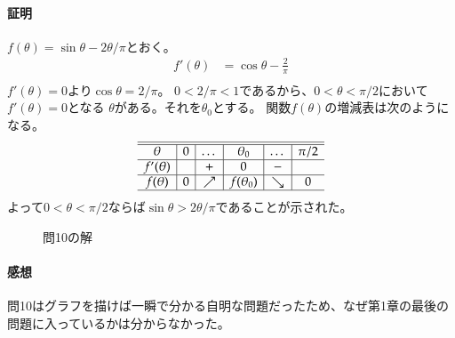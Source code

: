 \paragraph{証明}
$f(\theta)=\sin\theta-2\theta/\pi$とおく。
\begin{align*}
    f'(\theta)&=\cos\theta-\frac{2}{\pi}\\
\end{align*}
$f'(\theta)=0$より$\cos\theta=2/\pi$。
$0<2/\pi<1$であるから、$0<\theta<\pi/2$において$f'(\theta)=0$となる
$\theta$がある。それを$\theta_0$とする。
関数$f(\theta)$の増減表は次のようになる。
\begin{align*}
    \begin{array}{c|c|c|c|c|c}\hline\hline
        \theta     & 0 & \dots    & \theta_0 & \dots & \pi/2 \\ \hline
        f'(\theta) &   & +        & 0        & -        & \\ \hline
        f(\theta)  & 0 & \nearrow & f(\theta_0)        & \searrow & 0 \\ \hline
    \end{array}
\end{align*}
よって$0<\theta<\pi/2$ならば$\sin\theta>2\theta/\pi$であることが示された。
\begin{figure}[t]
    \centering
    \scalebox{0.6}{}
    \caption{問10の解}
\end{figure}
\paragraph{感想}
問10はグラフを描けば一瞬で分かる自明な問題だったため、なぜ第1章の最後の問題に入っているかは分からなかった。